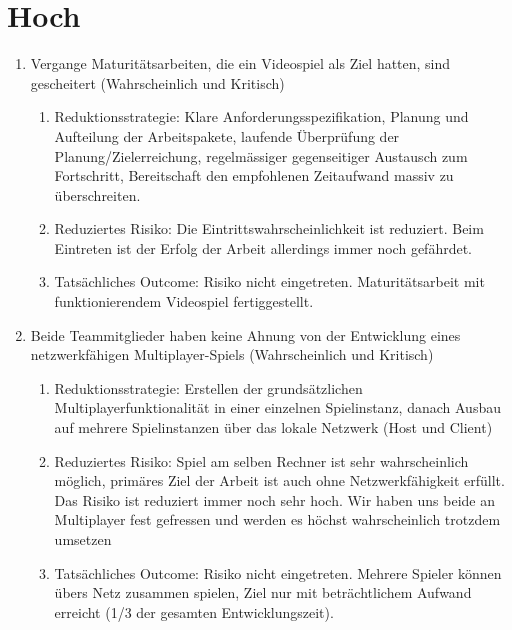 \section{Hoch}
\begin{enumerate}
    \item Vergange Maturitätsarbeiten, die ein Videospiel als Ziel hatten, sind gescheitert (Wahrscheinlich und Kritisch)
    \begin{enumerate}
        \item Reduktionsstrategie: Klare Anforderungsspezifikation, Planung und Aufteilung der Arbeitspakete, laufende Überprüfung der Planung/Zielerreichung, regelmässiger gegenseitiger Austausch zum Fortschritt,
        Bereitschaft den empfohlenen Zeitaufwand massiv zu überschreiten.
        \item Reduziertes Risiko: Die Eintrittswahrscheinlichkeit ist reduziert. Beim Eintreten ist der Erfolg der Arbeit allerdings immer noch gefährdet.
        \item Tatsächliches Outcome: Risiko nicht eingetreten. Maturitätsarbeit mit funktionierendem Videospiel fertiggestellt.
    \end{enumerate}

    \item Beide Teammitglieder haben keine Ahnung von der Entwicklung eines netzwerkfähigen Multiplayer-Spiels (Wahrscheinlich und Kritisch)
    \begin{enumerate}
        \item Reduktionsstrategie: Erstellen der grundsätzlichen Multiplayerfunktionalität in einer einzelnen Spielinstanz, danach Ausbau auf mehrere Spielinstanzen über das lokale Netzwerk (Host und Client)
        \item Reduziertes Risiko: Spiel am selben Rechner ist sehr wahrscheinlich möglich, primäres Ziel der Arbeit ist auch ohne Netzwerkfähigkeit erfüllt.
            Das Risiko ist reduziert immer noch sehr hoch.
            Wir haben uns beide an Multiplayer fest gefressen und werden es höchst wahrscheinlich trotzdem umsetzen
        \item Tatsächliches Outcome: Risiko nicht eingetreten. Mehrere Spieler können übers Netz zusammen spielen, Ziel nur mit beträchtlichem Aufwand erreicht (1/3 der gesamten Entwicklungszeit).
    \end{enumerate}


\end{enumerate}
